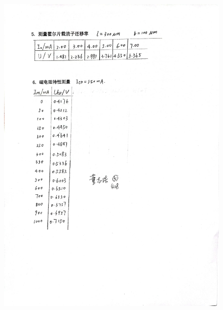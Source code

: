 \documentclass[UTF8]{ctexart}
\begin{document}
\begin{figure}[H]
  \centering
  \includegraphics[scale=0.15]{记录3.jpg}
\end{figure}
\end{document}
